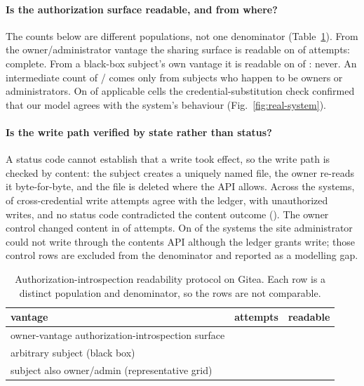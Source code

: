 \paragraph{Is the authorization surface readable, and from where?}
The counts below are different populations, not one denominator
(Table~\ref{tab:introspection-readable}). From the owner/administrator vantage the sharing
surface is readable on \ResRsOwnerReadable{} of \ResRsOwnerReadableTotal{} attempts:
complete. From a black-box subject's own vantage it is readable on
\ResRsBlackboxSelfReadable{} of \ResRsBlackboxSelfCells{}: never. An intermediate count of
\ResRsSelfReadable{}/\ResRsSelfTotal{} comes only from subjects who happen to be owners or
administrators. On \ResRsFidelityConsistent{} of \ResRsFidelityTotal{} applicable cells the
credential-substitution check confirmed that our model agrees with the system's behaviour
(Fig.~\ref{fig:real-system}).

\paragraph{Is the write path verified by state rather than status?}
A status code cannot establish that a write took effect, so the write path is checked by
content: the subject creates a uniquely named file, the owner re-reads it byte-for-byte, and
the file is deleted where the API allows. Across the \ResWpSystems{} systems,
\ResWpAgreeTotal{} of \ResWpPairsTotal{} cross-credential write attempts agree with the
ledger, with \ResWpUnauthTotal{} unauthorized writes, and no status code contradicted the
content outcome (\ResWpStatusOnlyDisagreements{}). The owner control changed content in
\ResWpOwnerObservedTotal{} of \ResWpOwnerRowsTotal{} attempts. On \ResWpAdminBlockedSystems{}
of the \ResWpSystems{} systems the site administrator could not write through the contents
API although the ledger grants write; those \ResWpAdminRowsTotal{} control rows are excluded
from the denominator and reported as a modelling gap.
\begin{table}[t]
\centering
\caption{Authorization-introspection readability protocol on Gitea. Each row is a
distinct population and denominator, so the rows are not comparable.}
\label{tab:introspection-readable}
\small
\begin{tabular}{@{}p{}rr@{}}
\toprule
vantage & attempts & readable \\
\midrule
owner-vantage authorization-introspection surface & \ResRsOwnerReadableTotal{} & \ResRsOwnerReadable{} \\
arbitrary subject (black box) & \ResRsBlackboxSelfCells{} & \ResRsBlackboxSelfReadable{} \\
subject also owner/admin (representative grid) & \ResRsSelfTotal{} & \ResRsSelfReadable{} \\
\bottomrule
\end{tabular}
\end{table}

